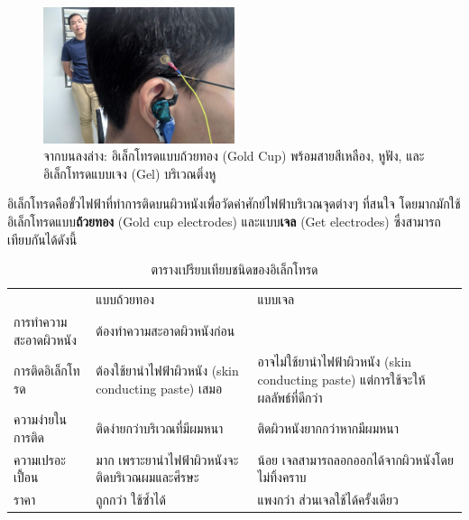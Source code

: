 \begin{figure}[h]
    \centering
    \includegraphics[width=0.5\textwidth]{images/IMG_20190610_155141.jpg}
    \caption{จากบนลงล่าง: อิเล็กโทรดแบบถ้วยทอง (Gold Cup) พร้อมสายสีเหลือง, หูฟัง, และอิเล็กโทรดแบบเจง (Gel) บริเวณติ่งหู}
\end{figure}

อิเล็กโทรดคือขั้วไฟฟ้าที่ทำการติดบนผิวหนังเพื่อวัดค่าศักย์ไฟฟ้าบริเวณจุดต่างๆ ที่สนใจ โดยมากมักใช้อิเล็กโทรดแบบ\textbf{ถ้วยทอง}
(Gold cup electrodes) และแบบ\textbf{เจล} (Get electrodes) ซึ่งสามารถเทียบกันได้ดังนี้

\begin{table}[H]
    \centering
    \begin{tabularx}{\textwidth}{l|X|X}
         & แบบถ้วยทอง & แบบเจล\\
        \hhline{===}
        การทำความสะอาดผิวหนัง  & \multicolumn{2}{l}{ต้องทำความสะอาดผิวหนังก่อน}\\
        \hline
        การติดอิเล็กโทรด & ต้องใช้ยานำไฟฟ้าผิวหนัง (skin conducting paste) เสมอ  & อาจไม่ใช้ยานำไฟฟ้าผิวหนัง (skin conducting paste) แต่การใช้จะให้ผลลัพธ์ที่ดีกว่า \\
        \hline
        ความง่ายในการติด & ติดง่ายกว่าบริเวณที่มีผมหนา & ติดผิวหนังยากกว่าหากมีผมหนา\\
        \hline
        ความเปรอะเปื้อน & มาก เพราะยานำไฟฟ้าผิวหนังจะติดบริเวณผมและศีรษะ & น้อย เจลสามารถลอกออกได้จากผิวหนังโดยไม่ทิ้งคราบ\\
        \hline
        ราคา & ถูกกว่า ใช้ซ้ำได้ & แพงกว่า ส่วนเจลใช้ได้ครั้งเดียว\\
    \end{tabularx}
    \caption{ตารางเปรียบเทียบชนิดของอิเล็กโทรด}
\end{table}
